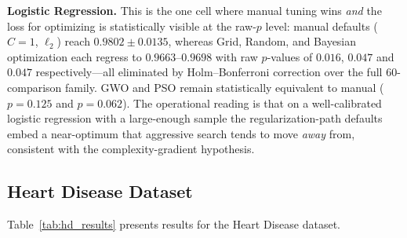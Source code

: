 \documentclass[letterpaper, 10 pt, conference]{ieeeconf}
\begin{document}
\textbf{Logistic Regression.} This is the one cell where manual tuning wins \emph{and} the loss for optimizing is statistically visible at the raw-$p$ level: manual defaults ($C = 1$, $\ell_2$) reach $0.9802 \pm 0.0135$, whereas Grid, Random, and Bayesian optimization each regress to $0.9663$--$0.9698$ with raw $p$-values of $0.016$, $0.047$ and $0.047$ respectively---all eliminated by Holm--Bonferroni correction over the full $60$-comparison family. GWO and PSO remain statistically equivalent to manual ($p = 0.125$ and $p = 0.062$). The operational reading is that on a well-calibrated logistic regression with a large-enough sample the regularization-path defaults embed a near-optimum that aggressive search tends to move \emph{away} from, consistent with the complexity-gradient hypothesis.

\subsection{Heart Disease Dataset}

Table~\ref{tab:hd_results} presents results for the Heart Disease dataset.
\end{document}
